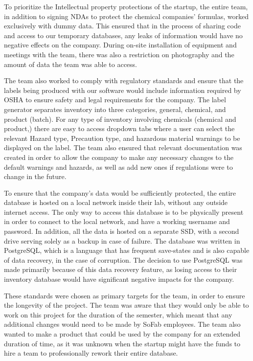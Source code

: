 \documentclass{article}
\begin{document}
To prioritize the Intellectual property protections of the startup, the entire team, in addition to signing NDAs to protect the 
chemical companies' formulas, worked exclusively with dummy data. This ensured that in the process of sharing code and access to our 
temporary databases, any leaks of information would have no negative effects on the company. During on-site installation of equipment 
and meetings with the team, there was also a restriction on photography and the amount of data the team was able to access.  

The team also worked to comply with regulatory standards and ensure that the labels being produced with our software would 
include information required by OSHA to ensure safety and legal requirements for the company. The label generator separates 
inventory into three categories, general, chemical, and product (batch). For any type of inventory involving chemicals (chemical 
and product,) there are easy to access dropdown tabs where a user can select the relevant Hazard type, Precaution type, and hazardous 
material warnings to be displayed on the label. The team also ensured that relevant documentation was created in order to allow the 
company to make any necessary changes to the default warnings and hazards, as well as add new ones if regulations were to change in 
the future. 

To ensure that the company’s data would be sufficiently protected, the entire database is hosted on a local network inside their 
lab, without any outside internet access. The only way to access this database is to be physically present in order to connect to 
the local network, and have a working username and password.  In addition, all the data is hosted on a separate SSD, with a second 
drive serving solely as a backup in case of failure. The database was written in PostgreSQL, which is a language that has frequent 
save-states and is also capable of data recovery, in the case of corruption. The decision to use PostgreSQL was made primarily 
because of this data recovery feature, as losing access to their inventory database would have significant negative impacts for the 
company. 

These standards were chosen as primary targets for the team, in order to ensure the longevity of the project. The team was aware 
that they would only be able to work on this project for the duration of the semester, which meant that any additional changes 
would need to be made by SoFab employees. The team also wanted to make a product that could be used by the company for an extended 
duration of time, as it was unknown when the startup might have the funds to hire a team to professionally rework their entire 
database.
\end{document}

